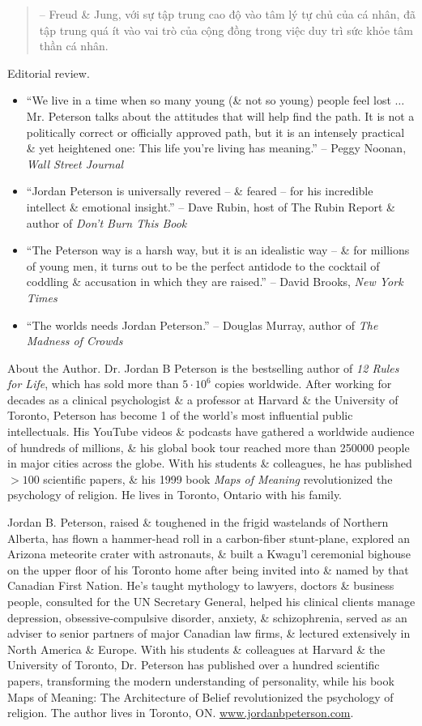 \documentclass{article}
\begin{document}
\begin{enumerate}
\begin{quotation}
		-- {\sc Freud} \& {\sc Jung}, với sự tập trung cao độ vào tâm lý tự chủ của cá nhân, đã tập trung quá ít vào vai trò của cộng đồng trong việc duy trì sức khỏe tâm thần cá nhân.
	\end{quotation}
	{\sf Editorial review.}
	\begin{itemize}
		\item ``We live in a time when so many young (\& not so young) people feel lost $\ldots$ Mr. {\sc Peterson} talks about the attitudes that will help find the path. It is not a politically correct or officially approved path, but it is an intensely practical \& yet heightened one: This life you're living has meaning.'' -- {\sc Peggy Noonan}, {\it Wall Street Journal}
		\item ``{\sc Jordan Peterson} is universally revered -- \& feared -- for his incredible intellect \& emotional insight.'' -- {\sc Dave Rubin}, host of The Rubin Report \& author of {\it Don't Burn This Book}
		\item ``The Peterson way is a harsh way, but it is an idealistic way -- \& for millions of young men, it turns out to be the perfect antidode to the cocktail of coddling \& accusation in which they are raised.'' -- {\sc David Brooks}, {\it New York Times}
		\item ``The worlds needs {\sc Jordan Peterson}.'' -- {\sc Douglas Murray}, author of {\it The Madness of Crowds}
	\end{itemize}
	{\sf About the Author.} Dr. {\sc Jordan B Peterson} is the bestselling author of {\it12 Rules for Life}, which has sold more than $5\cdot10^6$ copies worldwide. After working for decades as a clinical psychologist \& a professor at Harvard \& the University of Toronto, Peterson has become 1 of the world's most influential public intellectuals. His YouTube videos \& podcasts have gathered a worldwide audience of hundreds of millions, \& his global book tour reached more than 250000 people in major cities across the globe. With his students \& colleagues, he has published $> 100$ scientific papers, \& his 1999 book {\it Maps of Meaning} revolutionized the psychology of religion. He lives in Toronto, Ontario with his family.
	
	{\sc Jordan B. Peterson}, raised \& toughened in the frigid wastelands of Northern Alberta, has flown a hammer-head roll in a carbon-fiber stunt-plane, explored an Arizona meteorite crater with astronauts, \& built a Kwagu'l ceremonial bighouse on the upper floor of his Toronto home after being invited into \& named by that Canadian First Nation. He's taught mythology to lawyers, doctors \& business people, consulted for the UN Secretary General, helped his clinical clients manage depression, obsessive-compulsive disorder, anxiety, \& schizophrenia, served as an adviser to senior partners of major Canadian law firms, \& lectured extensively in North America \& Europe. With his students \& colleagues at Harvard \& the University of Toronto, Dr. Peterson has published over a hundred scientific papers, transforming the modern understanding of personality, while his book Maps of Meaning: The Architecture of Belief revolutionized the psychology of religion. The author lives in Toronto, ON. \url{www.jordanbpeterson.com}.
	

\end{enumerate}
\end{document}
